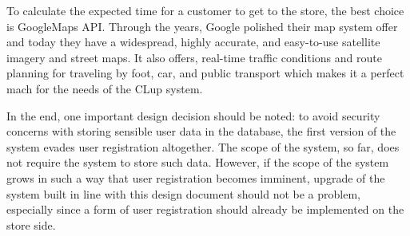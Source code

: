 To calculate the expected time for a customer to get to the store, the best choice is GoogleMaps API. Through the years, Google polished their map system offer and today they have a widespread, highly accurate, and easy-to-use satellite imagery and street maps. It also offers, real-time traffic conditions and route planning for traveling by foot, car, and public transport which makes it a perfect mach for the needs of the CLup system.\newline 

In the end, one important design decision should be noted: to avoid security concerns with storing sensible user data in the database, the first version of the system evades user registration altogether. The scope of the system, so far, does not require the system to store such data. However, if the scope of the system grows in such a way that user registration becomes imminent, upgrade of the system built in line with this design document should not be a problem, especially since a form of user registration should already be implemented on the store side. 
\newpage




